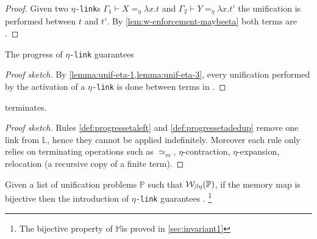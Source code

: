 \documentclass[sigconf,natbib=false,review]{acmart}
\newcommand{\UnifRel}{\ensuremath{\simeq}}
\newcommand{\Ue}{\ensuremath{\UnifRel_m}\xspace}
\newcommand{\linkMacro}[1]{\ensuremath{#1}\texttt{-link}\xspace}
\newcommand{\linketa} {\linkMacro{\eta}}
\newcommand{\linketaM}[3]{\ensuremath{#1 \vdash #2 =_\eta #3}}
\newcommand{\linkStore}{\texorpdfstring{\ensuremath{\mathbb{L}}\xspace}{L}}
\newcommand{\mapStore}{\texorpdfstring{\ensuremath{\mathbb{M}}\xspace}{M}}
\newcommand{\foUnifPb}{\ensuremath{\mathbb{P}}\xspace}
\begin{document}
\begin{proof}
  Given two \linketa{}s \linketaM{\Gamma_1}{X}{\lambda x.t} and
  \linketaM{\Gamma_2}{Y}{\lambda x.t'} 
  the unification is performed between $t$ and $t'$.
  By \cref{lem:w-enforcement-maybeeta} both terms are
  \wellb.
\end{proof}

\begin{lemma}
  The progress of \linketa guarantees 
  \label{lemma:unif-wellb}
\end{lemma}

\begin{proof}[Proof sketch]
  By \cref{lemma:unif-eta-1,lemma:unif-eta-3}, every
  unification performed by the activation of a \linketa is done between
  terms in \wellb.
\end{proof}

\begin{lemma}
   terminates.
  \label{lemma:prog-eta-terminates}
\end{lemma}

\begin{proof}[Proof sketch]
  Rules \ref{def:progressetaleft} and
  \ref{def:progressetadedup} remove one link from \linkStore, hence they
  cannot be applied indefinitely.
  Moreover each rule only relies on terminating operations such as \Ue,
  $\eta$-contraction, $\eta$-expansion, relocation (a recursive copy of a
  finite term).
\end{proof}  

\begin{theorem}
  Given a list of unification problems \foUnifPb such that
  $\wellb_{\beta \eta}(\foUnifPb)$, if the 
  memory map is bijective then
  the introduction 
  of \linketa guarantees .
  \footnote{The bijective property of \mapStore is proved in \cref{sec:invariant1}}
  \label{lemma:fidelity-maybeeta}
\end{theorem}
\end{document}
